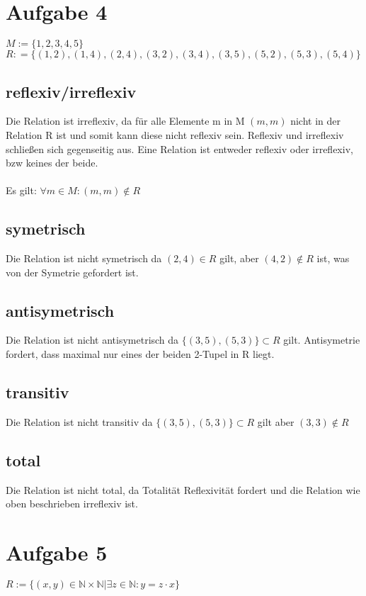 \documentclass[18pt,a4paper]{article}
\begin{document}
	\section*{Aufgabe 4}
	\begin{center}
	$M:= \{1,2,3,4,5\}$\newline
	$R: = \{(1,2),(1,4),(2,4),(3,2),(3,4),(3,5),(5,2),(5,3),(5,4) \}$
	\end{center}
	\subsection*{reflexiv/irreflexiv}
	Die Relation ist irreflexiv, da für alle Elemente m in M $(m,m)$ nicht in der Relation R ist und somit kann diese nicht reflexiv sein. Reflexiv und irreflexiv schließen sich gegenseitig aus. Eine Relation ist entweder reflexiv oder irreflexiv, bzw keines der beide.\\
	\\
	Es gilt: $\forall m \in M : (m,m) \notin R $
	\subsection*{symetrisch}
	Die Relation ist nicht symetrisch da $(2,4) \in R $ gilt, aber $(4,2) \notin R$ ist, was von der Symetrie gefordert ist.\\
	\subsection*{antisymetrisch}
	Die Relation ist nicht antisymetrisch da $\{(3,5),(5,3)\} \subset R$ gilt. Antisymetrie fordert, dass maximal nur eines der beiden 2-Tupel in R liegt.\\
	\subsection*{transitiv}
	Die Relation ist nicht transitiv da $\{(3,5),(5,3)\} \subset R$ gilt aber $(3,3) \notin R$\\
	\subsection*{total}
	Die Relation ist nicht total, da Totalität Reflexivität fordert und die Relation wie oben beschrieben irreflexiv ist.
	\newpage
	\section*{Aufgabe 5}
	\begin{center}
		$R:=\{(x,y) \in \mathbb{N}\times\mathbb{N}\vert \exists z \in \mathbb{N}: y=z\cdot x \}$
	\end{center}
\end{document}
